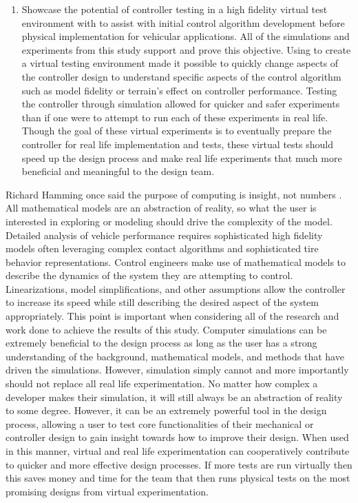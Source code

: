 \documentclass[12pt,onecolumn]{report}
\newcommand{\CHRONO}{{\sffamily{{Chrono}}}}
\begin{document}
\begin{enumerate}
\item
Showcase the potential of controller testing in a high fidelity virtual test environment with {\CHRONO} to assist with initial control algorithm development before physical implementation for vehicular applications. All of the simulations and experiments from this study support and prove this objective. Using {\CHRONO} to create a virtual testing environment made it possible to quickly change aspects of the controller design to understand specific aspects of the control algorithm such as model fidelity or terrain's effect on controller performance. Testing the controller through simulation allowed for quicker and safer experiments than if one were to attempt to run each of these experiments in real life. Though the goal of these virtual experiments is to eventually prepare the controller for real life implementation and tests, these virtual tests should speed up the design process and make real life experiments that much more beneficial and meaningful to the design team. 
\end{enumerate}

Richard Hamming once said the purpose of computing is insight, not numbers \cite{NumMethods}. All mathematical models are an abstraction of reality, so what the user is interested in exploring or modeling should drive the complexity of the model. Detailed analysis of vehicle performance requires sophisticated high fidelity models often leveraging complex contact algorithms and sophisticated tire behavior representations. Control engineers make use of mathematical models to describe the dynamics of the system they are attempting to control. Linearizations, model simplifications, and other assumptions allow the controller to increase its speed while still describing the desired aspect of the system appropriately. This point is important when considering all of the research and work done to achieve the results of this study. Computer simulations can be extremely beneficial to the design process as long as the user has a strong understanding of the background, mathematical models, and methods that have driven the simulations. However, simulation simply cannot and more importantly should not replace all real life experimentation. No matter how complex a developer makes their simulation, it will still always be an abstraction of reality to some degree. However, it can be an extremely powerful tool in the design process, allowing a user to test core functionalities of their mechanical or controller design to gain insight towards how to improve their design. When used in this manner, virtual and real life experimentation can cooperatively contribute to quicker and more effective design processes. If more tests are run virtually then this saves money and time for the team that then runs physical tests on the most promising designs from virtual experimentation.  
\end{document}

